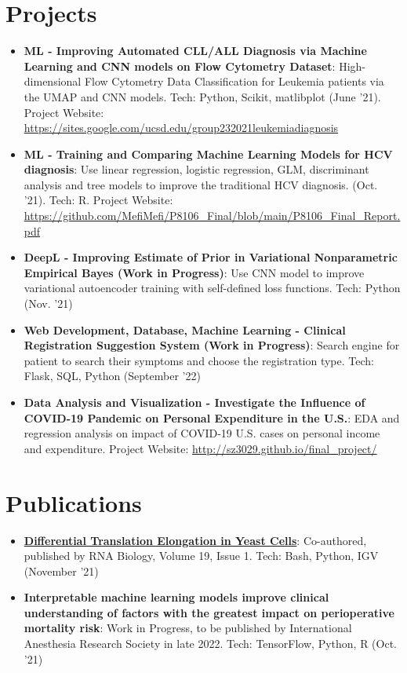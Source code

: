 \documentclass[a4paper,20pt]{article}
\newcommand{\resumeItem}[2]{
  \item\small{
    \textbf{#1}{: #2 \vspace{-2pt}}
  }
}
\newcommand{\resumeSubItem}[2]{\resumeItem{#1}{#2}\vspace{-3pt}}
\newcommand{\resumeSubHeadingListStart}{\begin{itemize}[leftmargin=*]}
\newcommand{\resumeSubHeadingListEnd}{\end{itemize}}
\begin{document}
\section{Projects}
\resumeSubHeadingListStart
\resumeSubItem{ML - Improving Automated CLL/ALL Diagnosis via Machine Learning and CNN models on Flow Cytometry Dataset}{High-dimensional Flow Cytometry Data Classification for Leukemia patients via the UMAP and CNN models. Tech: Python, Scikit, matlibplot (June '21).
    Project Website: \url{https://sites.google.com/ucsd.edu/group232021leukemiadiagnosis}}
\vspace{2pt}
\resumeSubItem{ML - Training and Comparing Machine Learning Models for HCV diagnosis}{Use linear regression, logistic regression, GLM, discriminant analysis and tree models to improve the traditional HCV diagnosis. (Oct. '21). Tech: R. Project Website: \url{https://github.com/MefiMefi/P8106_Final/blob/main/P8106_Final_Report.pdf}}
\vspace{2pt}
\resumeSubItem{DeepL - Improving Estimate of Prior in Variational Nonparametric Empirical Bayes (Work in Progress)}{Use CNN model to improve variational autoencoder training with self-defined loss functions. Tech: Python (Nov. '21)}
\vspace{2pt}
\resumeSubItem{Web Development, Database, Machine Learning - Clinical Registration Suggestion System (Work in Progress)}{Search engine for patient to search their symptoms and choose the registration type. Tech: Flask, SQL, Python (September '22)}
\vspace{2pt}
\resumeItem{Data Analysis and Visualization - Investigate the Influence of COVID-19 Pandemic on Personal Expenditure in the U.S.}{EDA and regression analysis on impact of COVID-19 U.S. cases on personal income and expenditure. Project Website: \url{http://sz3029.github.io/final_project/}}
\resumeSubHeadingListEnd
\vspace{-5pt}
\section{Publications}
\resumeSubHeadingListStart
\resumeSubItem{\href{https://pubmed.ncbi.nlm.nih.gov/35491906/}{Differential Translation Elongation in Yeast Cells}}{Co-authored, published by RNA Biology, Volume 19, Issue 1. Tech: Bash, Python, IGV (November '21)}
\vspace{2pt}
\resumeSubItem{Interpretable machine learning models improve clinical understanding of factors with the greatest impact on perioperative mortality risk}{Work in Progress, to be published by International Anesthesia Research Society in late 2022. Tech: TensorFlow, Python, R (Oct. '21)}
\resumeSubHeadingListEnd
\vspace{-5pt}
\end{document}
